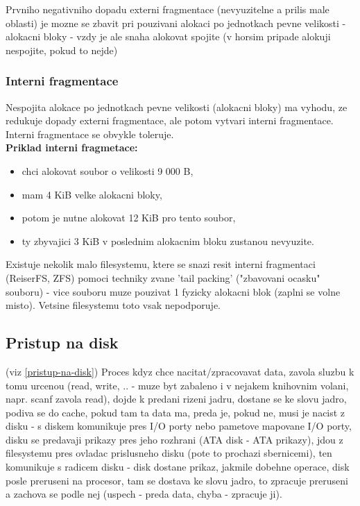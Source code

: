 \documentclass[a4paper, 11pt]{article}
\begin{document}
\noindent Prvniho negativniho dopadu externi fragmentace (nevyuzitelne a prilis male oblasti) je mozne se zbavit pri pouzivani alokaci po jednotkach pevne velikosti - alokacni bloky - vzdy je ale snaha alokovat spojite (v horsim pripade alokuji nespojite, pokud to nejde) \\

\subsubsection{Interni fragmentace}
Nespojita alokace po jednotkach pevne velikosti (alokacni bloky) ma vyhodu, ze redukuje dopady externi fragmentace, ale potom vytvari interni fragmentace. Interni fragmentace se obvykle toleruje.  \\

\noindent\textbf{Priklad interni fragmetace:}
\begin{itemize}
    \item chci alokovat soubor o velikosti 9 000 B,
    \item mam 4 KiB velke alokacni bloky,
    \item potom je nutne alokovat 12 KiB pro tento soubor,
    \item ty zbyvajici 3 KiB v poslednim alokacnim bloku zustanou nevyuzite. \\
\end{itemize}

\noindent Existuje nekolik malo filesystemu, ktere se snazi resit interni fragmentaci (ReiserFS, ZFS) pomoci techniky zvane 'tail packing' ("zbavovani ocasku" souboru) - vice souboru muze pouzivat 1 fyzicky alokacni blok (zaplni se volne misto). Vetsine filesystemu toto vsak nepodporuje. \\

\newpage

\subsection{Pristup na disk} \label{pristup-na-disk-detailed}
(viz \ref{pristup-na-disk}) Proces kdyz chce nacitat/zpracovavat data, zavola sluzbu k tomu urcenou (read, write, .. - muze byt zabaleno i v nejakem knihovnim volani, napr. scanf zavola read), dojde k predani rizeni jadru, dostane se ke slovu jadro, podiva se do cache, pokud tam ta data ma, preda je, pokud ne, musi je nacist z disku - s diskem komunikuje pres I/O porty nebo pametove mapovane I/O porty, disku se predavaji prikazy pres jeho rozhrani (ATA disk - ATA prikazy), jdou z filesystemu pres ovladac prislusneho disku (pote to prochazi sbernicemi), ten komunikuje s radicem disku - disk dostane prikaz, jakmile dobehne operace, disk posle preruseni na procesor, tam se dostava ke slovu jadro, to zpracuje preruseni a zachova se podle nej (uspech - preda data, chyba - zpracuje ji). \\
\end{document}
